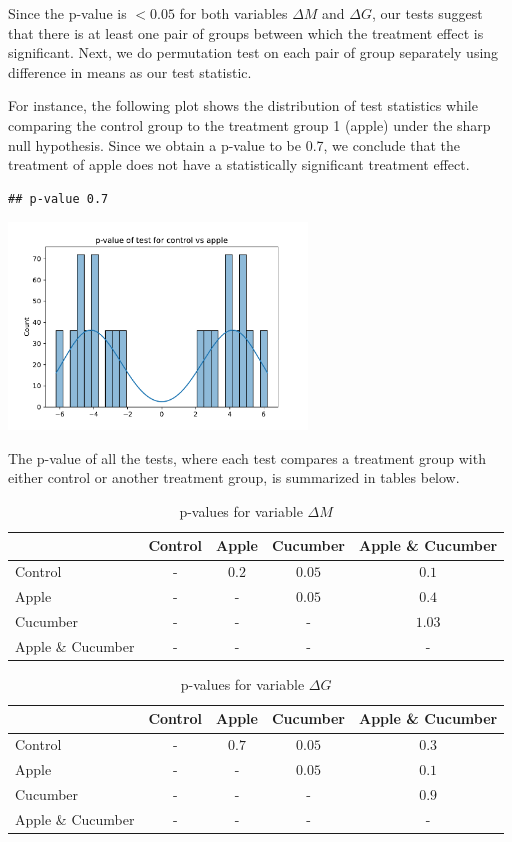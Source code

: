 \documentclass[
  12pt,
]{article}
\begin{document}
Since the p-value is \(<0.05\) for both variables \(\Delta M\) and
\(\Delta G\), our tests suggest that there is at least one pair of
groups between which the treatment effect is significant. Next, we do
permutation test on each pair of group separately using difference in
means as our test statistic.

For instance, the following plot shows the distribution of test
statistics while comparing the control group to the treatment group 1
(apple) under the sharp null hypothesis. Since we obtain a p-value to be
0.7, we conclude that the treatment of apple does not have a
statistically significant treatment effect.

\begin{verbatim}
## p-value 0.7
\end{verbatim}

\includegraphics[width=300px]{report_files/figure-latex/unnamed-chunk-12-5}

The p-value of all the tests, where each test compares a treatment group
with either control or another treatment group, is summarized in tables
below.

\begin{table}[H]
\begin{tabular}{l|cccc}
 & Control & Apple & Cucumber & Apple \& Cucumber \\
 \hline
Control & - & $0.2$ & $0.05$ & $0.1$ \\
Apple & - & - & $0.05$ & $0.4$ \\
Cucumber & - & - & - & $1.03$ \\
Apple \& Cucumber & - & - & - & - \\
\hline
\end{tabular}
\label{table:pvalues_deltaM}
\caption{p-values for variable $\Delta M$}
\end{table}

\begin{table}[H]
\begin{tabular}{l|cccc}
 & Control & Apple & Cucumber & Apple \& Cucumber \\
 \hline
Control & - & $0.7$ & $0.05$ & $0.3$ \\
Apple & - & - & $0.05$ & $0.1$ \\
Cucumber & - & - & - & $0.9$ \\
Apple \& Cucumber & - & - & - & - \\
\hline
\end{tabular}
\label{table:pvalues_deltaG}
\caption{p-values for variable $\Delta G$}
\end{table}
\end{document}
